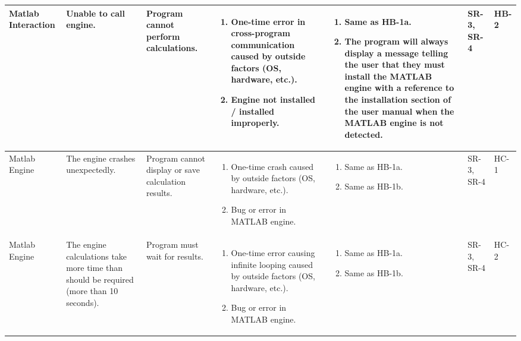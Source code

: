 \documentclass{article}
\begin{document}
\begin{landscape}
\begin{longtable}{|p{} | p{} | p{} | p{} | p{} | p{} | p{}|}
  Matlab Interaction & Unable to call engine. & Program cannot perform calculations. &
  \begin{enumerate}[leftmargin=*, label={\alph*.}, itemsep=1pt, topsep=0pt, partopsep=0pt] 
    \item One-time error in cross-program communication caused by outside factors (OS, hardware, etc.).
    \item Engine not installed / installed improperly.
  \end{enumerate} &
  \begin{enumerate}[leftmargin=*, label={\alph*.}, itemsep=1pt, topsep=0pt, partopsep=0pt] 
    \item Same as HB-1a.
    \item The program will always display a message telling the user that they must install the MATLAB engine with a 
    reference to the installation section of the user manual when the MATLAB engine is not detected.
  \end{enumerate} &
  SR-3, SR-4 & HB-2 \\

  \hline

  Matlab Engine & The engine crashes unexpectedly. & Program cannot display or save calculation results. &
  \begin{enumerate}[leftmargin=*, label={\alph*.}, itemsep=1pt, topsep=0pt, partopsep=0pt] 
    \item One-time crash caused by outside factors (OS, hardware, etc.).
    \item Bug or error in MATLAB engine.
  \end{enumerate} &
  \begin{enumerate}[leftmargin=*, label={\alph*.}, itemsep=1pt, topsep=0pt, partopsep=0pt] 
    \item Same as HB-1a.
    \item Same as HB-1b.
  \end{enumerate} &
  SR-3, SR-4 & HC-1 \\

  \hline

  Matlab Engine & The engine calculations take more time than should be required (more than 10 seconds). &
  Program must wait for results. &
  \begin{enumerate}[leftmargin=*, label={\alph*.}, itemsep=1pt, topsep=0pt, partopsep=0pt] 
    \item One-time error causing infinite looping caused by outside factors (OS, hardware, etc.).
    \item Bug or error in MATLAB engine.
  \end{enumerate} &
  \begin{enumerate}[leftmargin=*, label={\alph*.}, itemsep=1pt, topsep=0pt, partopsep=0pt] 
    \item Same as HB-1a.
    \item Same as HB-1b.
  \end{enumerate} &
  SR-3, SR-4 & HC-2 \\


\end{longtable}
\end{landscape}
\end{document}
